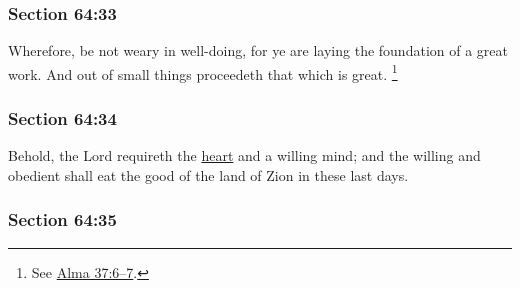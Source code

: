 
	\subsubsection{Section 64:33} %
		\label{DC64-33}

		Wherefore, be not weary in well-doing, for ye are laying the foundation of a great work.  And out of small things proceedeth that which is great.%
			\footnote{%
				See \hyperref[ALMA-37-6]{Alma 37:6--7}.
				}


	\subsubsection{Section 64:34} %
		\label{DC64-34}

		Behold, the Lord requireth the \hyperref[HEART]{heart} and a willing mind; and the willing and obedient shall eat the good of the land of Zion in these last days.


	\subsubsection{Section 64:35} %
		\label{DC64-35}

